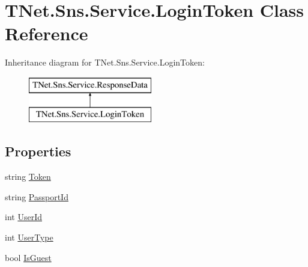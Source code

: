 \hypertarget{class_t_net_1_1_sns_1_1_service_1_1_login_token}{}\section{T\+Net.\+Sns.\+Service.\+Login\+Token Class Reference}
\label{class_t_net_1_1_sns_1_1_service_1_1_login_token}


 


Inheritance diagram for T\+Net.\+Sns.\+Service.\+Login\+Token\+:\begin{figure}[H]
\begin{center}
\leavevmode
\includegraphics[height=2.000000cm]{class_t_net_1_1_sns_1_1_service_1_1_login_token}
\end{center}
\end{figure}
\subsection*{Properties}
\begin{DoxyCompactItemize}
\item 
string \mbox{\hyperlink{class_t_net_1_1_sns_1_1_service_1_1_login_token_a4e9d5c8e006b13fdd09498e571495c5c}{Token}}
\item 
string \mbox{\hyperlink{class_t_net_1_1_sns_1_1_service_1_1_login_token_a56d44d9188ec806743046caa47040ba7}{Passport\+Id}}
\item 
int \mbox{\hyperlink{class_t_net_1_1_sns_1_1_service_1_1_login_token_ae06ff820f9291f750828edc4efe7f535}{User\+Id}}
\item 
int \mbox{\hyperlink{class_t_net_1_1_sns_1_1_service_1_1_login_token_aa0893ce0e604ca567bc91dfbcbf9ffda}{User\+Type}}
\item 
bool \mbox{\hyperlink{class_t_net_1_1_sns_1_1_service_1_1_login_token_af7c88647be98387cd7a8bd2c70453a7f}{Is\+Guest}}
\end{DoxyCompactItemize}


